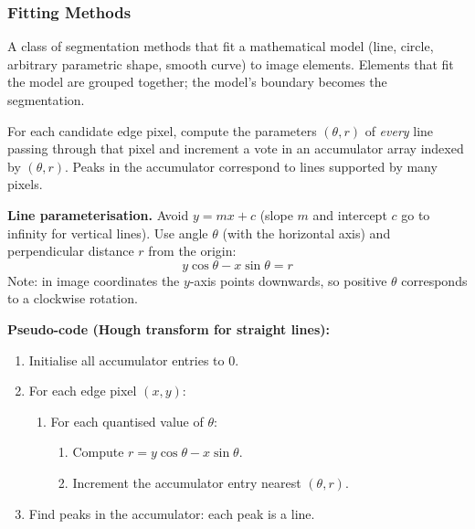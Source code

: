 \bigseparator

\subsubsection{Fitting Methods}

\begin{defbox}[Fitting]
A class of segmentation methods that fit a mathematical model (line, circle, arbitrary parametric shape, smooth curve) to image elements. Elements that fit the model are grouped together; the model's boundary becomes the segmentation.
\end{defbox}

\separator

\begin{defbox}
For each candidate edge pixel, compute the parameters $(\theta, r)$ of \emph{every} line passing through that pixel and increment a vote in an accumulator array indexed by $(\theta, r)$. Peaks in the accumulator correspond to lines supported by many pixels.
\end{defbox}

\textbf{Line parameterisation.} Avoid $y = mx + c$ (slope $m$ and intercept $c$ go to infinity for vertical lines). Use angle $\theta$ (with the horizontal axis) and perpendicular distance $r$ from the origin:
\[
y \cos\theta - x \sin\theta = r
\]
Note: in image coordinates the $y$-axis points downwards, so positive $\theta$ corresponds to a clockwise rotation.

\textbf{Pseudo-code (Hough transform for straight lines):}
\begin{enumerate}
  \item Initialise all accumulator entries to 0.
  \item For each edge pixel $(x, y)$:
  \begin{enumerate}
    \item For each quantised value of $\theta$:
    \begin{enumerate}
      \item Compute $r = y \cos\theta - x \sin\theta$.
      \item Increment the accumulator entry nearest $(\theta, r)$.
    \end{enumerate}
  \end{enumerate}
  \item Find peaks in the accumulator: each peak is a line.
\end{enumerate}

